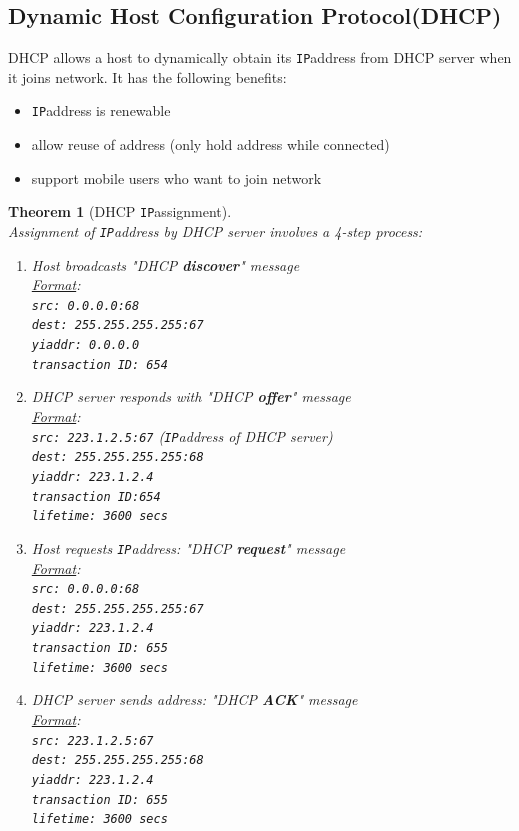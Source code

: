 \documentclass[12pt]{article}
\newcommand\IP{\texttt{IP}}
\newtheorem{theorem}{Theorem}[section]
\theoremstyle{definition}
\begin{document}
\subsection{Dynamic Host Configuration Protocol(DHCP)}
DHCP allows a host to dynamically obtain its \IP address from DHCP server when it joins network. It has the following benefits:
\begin{itemize}
  \item \IP address is renewable
  \item allow reuse of address (only hold address while connected)
  \item support mobile users who want to join network
\end{itemize}
\begin{theorem}[DHCP \IP assignment]\hfill\\\normalfont
Assignment of \IP address by DHCP server involves a 4-step process:
\begin{enumerate}
  \item Host broadcasts "DHCP \textbf{discover}" message\\
  \underline{Format}:\\
  \texttt{src: 0.0.0.0:68}\\
  \texttt{dest: 255.255.255.255:67}\\
  \texttt{yiaddr: 0.0.0.0}\\
  \texttt{transaction ID: 654}
  \item DHCP server responds with "DHCP \textbf{offer}" message\\
  \underline{Format}:\\
  \texttt{src: 223.1.2.5:67} (\IP address of DHCP server)\\
  \texttt{dest: 255.255.255.255:68}\\
  \texttt{yiaddr: 223.1.2.4}\\
  \texttt{transaction ID:654}\\
  \texttt{lifetime: 3600 secs}
  \item Host requests \IP address: "DHCP \textbf{request}" message\\
  \underline{Format}:\\
  \texttt{src: 0.0.0.0:68}\\
  \texttt{dest: 255.255.255.255:67}\\
  \texttt{yiaddr: 223.1.2.4}\\
  \texttt{transaction ID: 655}\\
  \texttt{lifetime: 3600 secs}
  \item DHCP server sends address: "DHCP \textbf{ACK}" message\\
  \underline{Format}:\\
  \texttt{src: 223.1.2.5:67}\\
  \texttt{dest: 255.255.255.255:68}\\
  \texttt{yiaddr: 223.1.2.4}\\
  \texttt{transaction ID: 655}\\
  \texttt{lifetime: 3600 secs}
\end{enumerate}
\end{theorem}
\end{document}

